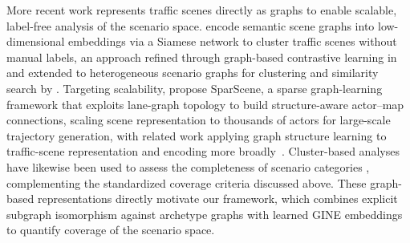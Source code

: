 More recent work represents traffic scenes directly as graphs to enable scalable, label-free analysis of the scenario space. \cite{zipfl2022selfsupervised} encode semantic scene graphs into low-dimensional embeddings via a Siamese network to cluster traffic scenes without manual labels, an approach refined through graph-based contrastive learning in \cite{zipfl2023similarity} and extended to heterogeneous scenario graphs for clustering and similarity search by \cite{muetsch2025semantic}. Targeting scalability, \cite{mo2025sparscene} propose SparScene, a sparse graph-learning framework that exploits lane-graph topology to build structure-aware actor--map connections, scaling scene representation to thousands of actors for large-scale trajectory generation, with related work applying graph structure learning to traffic-scene representation and encoding more broadly~\cite{mo2025graphstructure}. Cluster-based analyses have likewise been used to assess the completeness of scenario categories \cite{rossberg2025completeness}, complementing the standardized coverage criteria discussed above. These graph-based representations directly motivate our framework, which combines explicit subgraph isomorphism against archetype graphs with learned GINE embeddings to quantify coverage of the scenario space.

